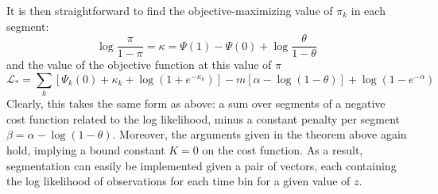 \documentclass[11pt]{article}
\begin{document}
It is then straightforward to find the objective-maximizing value of $\pi_k$ in each segment:
\begin{equation}
    \log \frac{\pi}{1 - \pi} = \kappa = \Psi(1) - \Psi(0) + \log \frac{\theta}{1 - \theta}
\end{equation}
and the value of the objective function at this value of $\pi$
\begin{equation}
    \mathcal{L}_* = \sum_k [\Psi_k(0) +  \kappa_k +
    \log (1 + e^{-\kappa_k})] - m [\alpha - \log (1 - \theta)] + \log (1 - e^{-\alpha})
\end{equation}
Clearly, this takes the same form as above: a sum over segments of a negative cost function related to the log likelihood, minus a constant penalty per segment $\beta = \alpha - \log (1 - \theta)$. Moreover, the arguments given in the theorem above again hold, implying a bound constant $K = 0$ on the cost function. As a result, segmentation can easily be implemented given a pair of vectors, each containing the log likelihood of observations for each time bin for a given value of $z$.
\end{document}
